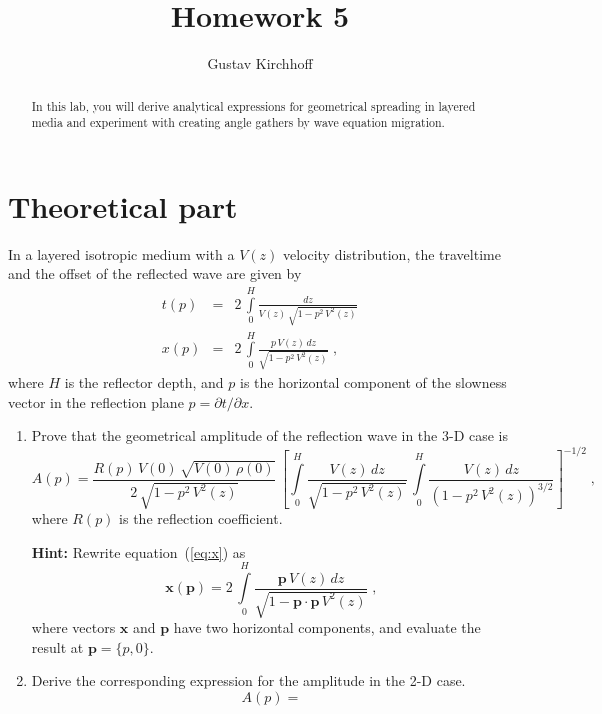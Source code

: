 \author{Gustav Kirchhoff}
\title{Homework 5}

\begin{abstract}
In this lab, you will derive analytical expressions for geometrical
spreading in layered media and experiment with creating angle gathers
by wave equation migration.
\end{abstract}


\section{Theoretical part}

In a layered isotropic medium with a $V(z)$ velocity distribution, the
traveltime and the offset of the reflected wave are given by
\begin{eqnarray}
  \label{eq:t}
  t(p) & = & 2\,\int\limits_{0}^{H} \frac{d z}{V(z)\,\sqrt{1-p^2\,V^2(z)}} \\
  \label{eq:x}
  x(p) & = & 2\,\int\limits_{0}^{H} \frac{p\,V(z)\,d z}{\sqrt{1-p^2\,V^2(z)}}\;,
\end{eqnarray}
where $H$ is the reflector depth, and $p$ is the horizontal component
of the slowness vector in the reflection plane $p = \partial
t/\partial x$. 

\begin{enumerate}
\item Prove that the geometrical amplitude of the reflection
  wave in the 3-D case is
\begin{equation}
  A(p) = \frac{R(p)\,V(0)\,\sqrt{V(0)\,\rho(0)}}{2\,\sqrt{1-p^2\,V^2(z)}}\,
    \left[\int\limits_{0}^{H} \frac{V(z)\,d z}{\sqrt{1-p^2\,V^2(z)}}\,
      \int\limits_{0}^{H} \frac{V(z)\,d z}{\left(1-p^2\,V^2(z)\right)^{3/2}}
    \right]^{-1/2}\;,
\label{eq:a3}
\end{equation}
where $R(p)$ is the reflection coefficient.

\textbf{Hint:} Rewrite equation~(\ref{eq:x}) as
\begin{equation}
  \label{eq:x3}
  \mathbf{x}(\mathbf{p}) = 2\,\int\limits_{0}^{H} \frac{\mathbf{p}\,V(z)\,d z}{\sqrt{1-\mathbf{p} \cdot \mathbf{p}\,V^2(z)}}\;,
\end{equation}
where vectors $\mathbf{x}$ and $\mathbf{p}$ have two horizontal
components, and evaluate the result at $\mathbf{p}=\{p,0\}$.
 
\item Derive the corresponding expression for the amplitude in the 2-D case.
\begin{equation}
  \label{eq:a2}
  A(p) =
\end{equation}

\end{enumerate}

